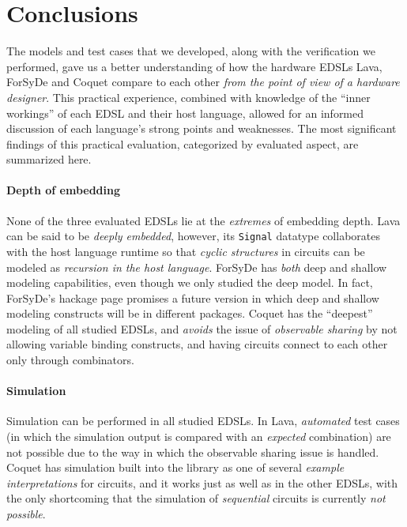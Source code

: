 \section{Conclusions}
\label{sec:conclusions}

    The models and test cases that we developed, along with the verification we performed, gave us
    a better understanding of how the hardware EDSLs Lava, ForSyDe and Coquet compare to each other
    \emph{from the point of view of a hardware designer}. This practical experience, combined with
    knowledge of the ``inner workings'' of each EDSL and their host language, allowed for an
    informed discussion of each language's strong points and weaknesses. The most significant
    findings of this practical evaluation, categorized by evaluated aspect, are summarized here.

    \paragraph{Depth of embedding}
        None of the three evaluated EDSLs lie at the \emph{extremes} of embedding depth. Lava can be
        said to be \emph{deeply embedded}, however, its \texttt{Signal} datatype collaborates with
        the host language runtime so that \emph{cyclic structures} in circuits can be modeled as
        \emph{recursion in the host language}. ForSyDe has \emph{both} deep and shallow modeling
        capabilities, even though we only studied the deep model. In fact, ForSyDe's hackage
        page\cite{website:forsyde-hackage} promises a future version in which deep and shallow
        modeling constructs will be in different packages. Coquet has the ``deepest'' modeling of
        all studied EDSLs, and \emph{avoids} the issue of \emph{observable sharing} by not allowing
        variable binding constructs, and having circuits connect to each other only through
        combinators.

    \paragraph{Simulation}
        Simulation can be performed in all studied EDSLs. In Lava, \emph{automated} test cases (in
        which the simulation output is compared with an \emph{expected} combination) are not
        possible due to the way in which the observable sharing issue is handled. Coquet has
        simulation built into the library as one of several \emph{example interpretations} for
        circuits, and it works just as well as in the other EDSLs, with the only shortcoming that
        the simulation of \emph{sequential} circuits is currently \emph{not possible}.

